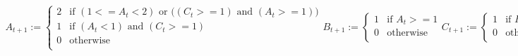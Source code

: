 \begin{center}




$
\begin{array}{cl}

A_{t+1} :=\left\{ \begin{array}{cl}
      2 & \mbox{if $(1 <= A_t < 2)$ or $((C_t >= 1)$ and $(A_t >= 1))$} \\
      1 & \mbox{if $(A_t < 1)$ and $(C_t >= 1)$} \\
      0 & \mbox{otherwise}  \\
     \end{array}
\right.
B_{t+1} :=\left\{ \begin{array}{cl}
      1 & \mbox{if $A_t >= 1$} \\
      0 & \mbox{otherwise}  \\
     \end{array}
\right.
C_{t+1} :=\left\{ \begin{array}{cl}
      1 & \mbox{if $B_t >= 1$} \\
      0 & \mbox{otherwise}  \\
     \end{array}
\right.
\end{array}
$

\end{center}

